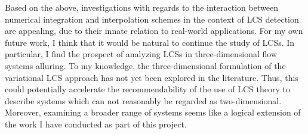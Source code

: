 Based on the above, investigations with regards to the interaction between
numerical integration and interpolation schemes in the context of LCS detection
are appealing, due to their innate relation to real-world applications.
For my own future work, I think that it would be natural to continue
the study of LCSs. In particular, I find the prospect of analyzing LCSs in
three-dimensional flow systems alluring. To my knowledge, the three-dimensional
formulation of the variational LCS approach has not yet been explored in the
literature. Thus, this could potentially accelerate the recommendability of
the use of LCS theory to describe systems which can not reasonably be regarded
as two-dimensional. Moreover, examining a broader range of systems seems like
a logical extension of the work I have conducted as part of this project.







